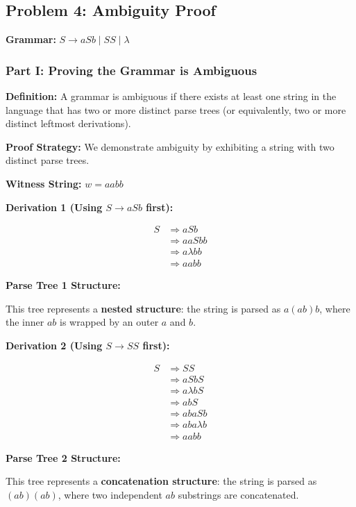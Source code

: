 \documentclass[12pt]{article}
\begin{document}
\subsection{Problem 4: Ambiguity Proof}

\textbf{Grammar:} $S \rightarrow aSb \mid SS \mid \lambda$

\subsubsection{Part I: Proving the Grammar is Ambiguous}

\textbf{Definition:} A grammar is ambiguous if there exists at least one string in the language that has two or more distinct parse trees (or equivalently, two or more distinct leftmost derivations).

\textbf{Proof Strategy:} We demonstrate ambiguity by exhibiting a string with two distinct parse trees.

\textbf{Witness String:} $w = aabb$

\textbf{Derivation 1 (Using $S \rightarrow aSb$ first):}

$$\begin{aligned}
S &\Rightarrow aSb \\
&\Rightarrow aaSbb \\
&\Rightarrow a\lambda bb \\
&\Rightarrow aabb
\end{aligned}$$

\textbf{Parse Tree 1 Structure:}

This tree represents a \textbf{nested structure}: the string is parsed as $a(ab)b$, where the inner $ab$ is wrapped by an outer $a$ and $b$.

\textbf{Derivation 2 (Using $S \rightarrow SS$ first):}

$$\begin{aligned}
S &\Rightarrow SS \\
&\Rightarrow aSbS \\
&\Rightarrow a\lambda bS \\
&\Rightarrow abS \\
&\Rightarrow abaSb \\
&\Rightarrow aba\lambda b \\
&\Rightarrow aabb
\end{aligned}$$

\textbf{Parse Tree 2 Structure:}

This tree represents a \textbf{concatenation structure}: the string is parsed as $(ab)(ab)$, where two independent $ab$ substrings are concatenated.
\end{document}
